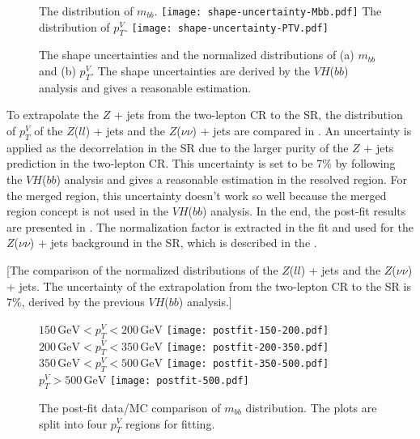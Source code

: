 \documentclass[class=NTHU_thesis, crop=false]{standalone}
\begin{document}
\begin{figure}[!hbt]
	\centering
	\subcaptionbox
	{The distribution of $m_{bb}$.
		\label{fig:shape-uncertainty-fig1}}
		{\texttt{[image: shape-uncertainty-Mbb.pdf]}}
	\vspace{\baselineskip}
	\subcaptionbox
	{The distribution of $p^V_T$.
		\label{fig:shape-uncertainty-fig2}}
		{\texttt{[image: shape-uncertainty-PTV.pdf]}}
	\caption{The shape uncertainties and the normalized distributions of (a) $m_{bb}$ and (b) $p^V_T$. The shape uncertainties are derived by the $VH$($bb$) analysis and gives a reasonable estimation.}
	\label{fig:shape-uncertainty}
\end{figure}

To extrapolate the $Z$ + jets from the two-lepton CR to the SR, the distribution of $p^V_T$ of the $Z$($ll$) + jets and the $Z$($\nu\nu$) + jets are compared in . An uncertainty is applied as the decorrelation in the SR due to the larger purity of the $Z$ + jets prediction in the two-lepton CR. This uncertainty is set to be 7\% by following the $VH$($bb$) analysis \cite{PhysRevLett.119.181804} and gives a reasonable estimation in the resolved region. For the merged region, this uncertainty doesn't work so well because the merged region concept is not used in the $VH$($bb$) analysis. In the end, the post-fit results are presented in . The normalization factor is extracted in the fit and used for the $Z$($\nu\nu$) + jets background in the SR, which is described in the .

[The comparison of the normalized distributions of the $Z$($ll$) + jets and the $Z$($\nu\nu$) + jets. The uncertainty of the extrapolation from the two-lepton CR to the SR is 7\%, derived by the previous $VH$($bb$) analysis.]

\begin{figure}[!hbt]
	\captionsetup[subfigure]{labelformat=empty}
	\centering
	\subcaptionbox
	{$150\, \mathrm{GeV} < p^V_T < 200\, \mathrm{GeV}$
		\label{fig:2-lep-postfit-fig1}}
		{\texttt{[image: postfit-150-200.pdf]}}
	\subcaptionbox
	{$200\, \mathrm{GeV} < p^V_T < 350\, \mathrm{GeV}$
		\label{fig:2-lep-postfit-fig2}}
		{\texttt{[image: postfit-200-350.pdf]}}
	\vspace{\baselineskip}
	\subcaptionbox
	{$350\, \mathrm{GeV} < p^V_T < 500\, \mathrm{GeV}$
		\label{fig:2-lep-postfit-fig3}}
		{\texttt{[image: postfit-350-500.pdf]}}
	\subcaptionbox
	{$p^V_T > 500\, \mathrm{GeV}$
		\label{fig:2-lep-postfit-fig4}}
		{\texttt{[image: postfit-500.pdf]}}
	\caption{The post-fit data/MC comparison of $m_{bb}$ distribution. The plots are split into four $p^V_T$ regions for fitting.}
	\label{fig:2-lep-postfit}
\end{figure}
\end{document}
